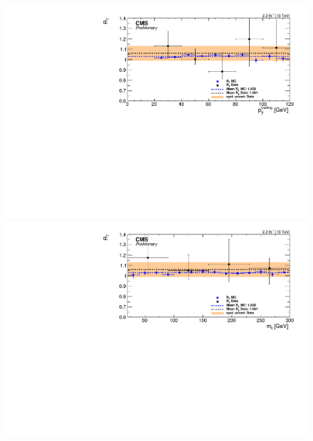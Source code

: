 \begin{figure}[htbp]
\begin{minipage}[t]{0.3\textwidth}
    \includegraphics[width=\textwidth]{bkgd/figs/Triggereff_SFvsOF_Syst_PFHT_HighHTExclusiveForward_Run2015_25ns_TrailingPt_None_NonIso_MC.pdf}
  \end{minipage}
  \begin{minipage}[t]{0.3\textwidth}
    \includegraphics[width=\textwidth]{bkgd/figs/Triggereff_SFvsOF_Syst_PFHT_HighHTExclusiveForward_Run2015_25ns_Mll_None_NonIso_MC.pdf}
  \end{minipage}
  \begin{minipage}[t]{0.3\textwidth}

\end{minipage}
\end{figure}
